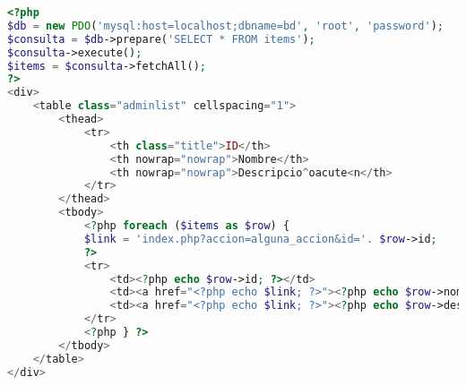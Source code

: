 \begin{lstlisting}[label=mvc_all_in_one,caption=Ejemplo sin ning\'un patr\'on,language=PHP]
<?php 
$db = new PDO('mysql:host=localhost;dbname=bd', 'root', 'password');	
$consulta = $db->prepare('SELECT * FROM items');
$consulta->execute();
$items = $consulta->fetchAll();
?>
<div>
    <table class="adminlist" cellspacing="1">
    	<thead>
        	<tr>
				<th class="title">ID</th>
                <th nowrap="nowrap">Nombre</th>
                <th nowrap="nowrap">Descripcio^oacute<n</th>
            </tr>
        </thead>
        <tbody>
        	<?php foreach ($items as $row) {
        	$link = 'index.php?accion=alguna_accion&id='. $row->id;
        	?>
            <tr>
                <td><?php echo $row->id; ?></td>
                <td><a href="<?php echo $link; ?>"><?php echo $row->nombre; ?></a></td>
                <td><a href="<?php echo $link; ?>"><?php echo $row->descripcion; ?></a></td>
            </tr>
            <?php } ?>
        </tbody>
    </table>
</div>
\end{lstlisting}
